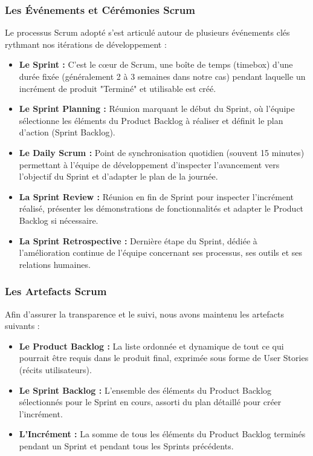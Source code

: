 \subsubsection{Les Événements et Cérémonies Scrum}
Le processus Scrum adopté s'est articulé autour de plusieurs événements clés rythmant nos itérations de développement :
\begin{itemize}
    \item \textbf{Le Sprint :} C'est le cœur de Scrum, une boîte de temps (timebox) d'une durée fixée (généralement 2 à 3 semaines dans notre cas) pendant laquelle un incrément de produit "Terminé" et utilisable est créé.
    \item \textbf{Le Sprint Planning :} Réunion marquant le début du Sprint, où l'équipe sélectionne les éléments du Product Backlog à réaliser et définit le plan d'action (Sprint Backlog).
    \item \textbf{Le Daily Scrum :} Point de synchronisation quotidien (souvent 15 minutes) permettant à l'équipe de développement d'inspecter l'avancement vers l'objectif du Sprint et d'adapter le plan de la journée.
    \item \textbf{La Sprint Review :} Réunion en fin de Sprint pour inspecter l'incrément réalisé, présenter les démonstrations de fonctionnalités et adapter le Product Backlog si nécessaire.
    \item \textbf{La Sprint Retrospective :} Dernière étape du Sprint, dédiée à l'amélioration continue de l'équipe concernant ses processus, ses outils et ses relations humaines.
\end{itemize}

\subsubsection{Les Artefacts Scrum}
Afin d'assurer la transparence et le suivi, nous avons maintenu les artefacts suivants :
\begin{itemize}
    \item \textbf{Le Product Backlog :} La liste ordonnée et dynamique de tout ce qui pourrait être requis dans le produit final, exprimée sous forme de User Stories (récits utilisateurs).
    \item \textbf{Le Sprint Backlog :} L'ensemble des éléments du Product Backlog sélectionnés pour le Sprint en cours, assorti du plan détaillé pour créer l'incrément.
    \item \textbf{L'Incrément :} La somme de tous les éléments du Product Backlog terminés pendant un Sprint et pendant tous les Sprints précédents.
\end{itemize}

